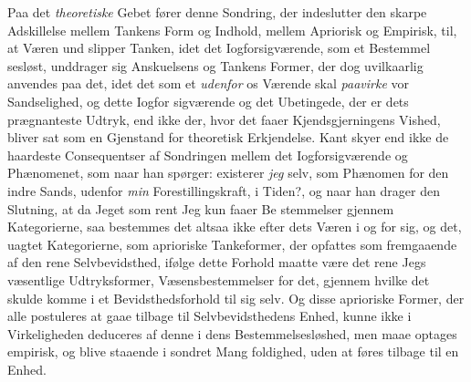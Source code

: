 \documentclass[12pt,a4paper]{book}
\begin{document}
Paa det \emph{theoretiske} Gebet fører denne Sondring, der
indeslutter den skarpe Adskillelse mellem Tankens Form og
Indhold, mellem Apriorisk og Empirisk, til, at Væren und\-%
slipper Tanken, idet det Iogforsigværende, som et Bestemmel\-%
sesløst, unddrager sig Anskuelsens og Tankens Former, der
dog uvilkaarlig anvendes paa det, idet det som et \emph{udenfor}
os Værende skal \emph{paavirke} vor Sandselighed, og dette Iogfor\-%
sigværende og det Ubetingede, der er dets prægnanteste
Udtryk, end ikke der, hvor det faaer Kjendsgjerningens
Vished, bliver sat som en Gjenstand for theoretisk Erkjendelse.
Kant skyer end ikke de haardeste Consequentser af Sondringen
mellem det Iogforsigværende og Phænomenet, som naar han
spørger: existerer \emph{jeg} selv, som Phænomen for den indre
Sands, udenfor \emph{min} Forestillingskraft, i Tiden?, og naar han
drager den Slutning, at da Jeget som rent Jeg kun faaer Be\-%
stemmelser gjennem Kategorierne, saa bestemmes det altsaa
ikke efter dets Væren i og for sig, og det, uagtet Kategorierne,
som aprioriske Tankeformer, der opfattes som fremgaaende af
den rene Selvbevidsthed, ifølge dette Forhold maatte være det
rene Jegs væsentlige Udtryksformer, Væsensbestemmelser for
det, gjennem hvilke det skulde komme i et Bevidsthedsforhold
til sig selv. Og disse aprioriske Former, der alle postuleres
at gaae tilbage til Selvbevidsthedens Enhed, kunne ikke i
Virkeligheden deduceres af denne i dens Bestemmelsesløshed,
men maae optages empirisk, og blive staaende i sondret Mang\-%
foldighed, uden at føres tilbage til en Enhed.
\end{document}
